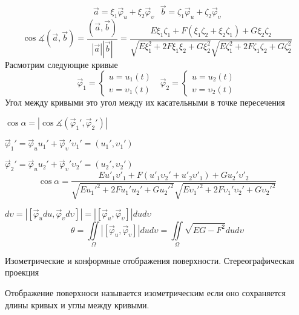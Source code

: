 \begin{block}
  $$
  \vec a = \xi_1 \vec \varphi_u + \xi_2 \vec \varphi_{\upsilon} ~~~
  \vec b = \zeta_1 \vec \varphi_u + \zeta_2 \vec \varphi_{\upsilon}
  $$
  $$
  \cos \measuredangle (\vec a, \vec b) =
  \frac{(\vec a, \vec b)}{|\vec a||\vec b|} =
  \frac{E \xi_1 \zeta_1 + F(\xi_1 \zeta_2 + \xi_2 \zeta_1) + G\xi_2 \zeta_2}
  {\sqrt{E\xi_1^2 + 2F\xi_1\xi_2 + G\xi_2^2}
  \sqrt{E\zeta_1^2 + 2F\zeta_1\zeta_2 + G\zeta_2^2}}
  $$
  Расмотрим следующие кривые
  $$
  \vec \varphi_1 =
  \left\{
    \begin{array}{l}
      u = u_1(t) \\
      \upsilon = \upsilon_1(t)
    \end{array}
  \right. ~~~
  \vec \varphi_2 =
  \left\{
    \begin{array}{l}
      u = u_2(t) \\
      \upsilon = \upsilon_2(t)
    \end{array}
  \right.
  $$
  Угол между кривыми это угол между их касательными в точке пересечения

  $\cos \alpha = |\cos \measuredangle (\vec \varphi_1', \vec \varphi_2')|$

  $\vec \varphi_1' = \vec \varphi_u u_1' + \vec \varphi_{\upsilon}'
  \upsilon_1' = (u_1', \upsilon_1')$

  $\vec \varphi_2' = \vec \varphi_u u_2' + \vec \varphi_{\upsilon}'
  \upsilon_2' = (u_2', \upsilon_2')$
  $$
  \cos \alpha = \frac{Eu'_1 \upsilon'_1 + F(u'_1\upsilon_2' + u'_2 \upsilon'_1)
  + Gu_2' \upsilon'_2}
  {\sqrt{Eu_1'^2 + 2Fu_1'u_2' + Gu_2'^2}
  \sqrt{E\upsilon_1'^2 + 2F\upsilon_1'\upsilon_2' + G\upsilon_2'^2}}
  $$
\end{block}

\begin{block}
  $d\upsilon = |[\vec \varphi_u du, \vec \varphi_{\upsilon} d\upsilon]| =
  |[\vec \varphi_u, \vec \varphi_{\upsilon}]| du d\upsilon$
  $$
  \theta = \iint \limits_{\Omega} |[\vec \varphi_u, \vec \varphi_{\upsilon}]|
  du d\upsilon = \iint \limits_{\Omega} \sqrt{EG - F^2}dud\upsilon
  $$
\end{block}

\begin{title}[\Large]
  Изометрические и конформные отображения поверхности. Стереографическая
  проекция
\end{title}

\begin{define}
  Отображение поверхноси называется изометрическим если оно сохраняется длины
  кривых и углы между кривыми.
\end{define}

